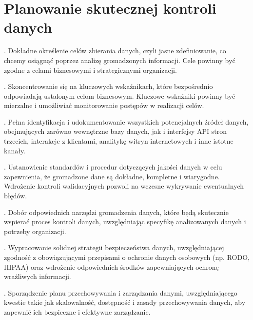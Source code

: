 \documentclass[letterpaper,10pt,polish]{sphinxmanual}
\begin{document}
\section{Planowanie skutecznej kontroli danych}
\label{\detokenize{Sprawozdanie_bazy_p1/main:planowanie-skutecznej-kontroli-danych}}
. 
Dokładne określenie celów zbierania danych, czyli jasne zdefiniowanie, co chcemy osiągnąć poprzez analizę gromadzonych informacji. Cele powinny być zgodne z celami biznesowymi i strategicznymi organizacji.

. 
Skoncentrowanie się na kluczowych wskaźnikach, które bezpośrednio odpowiadają ustalonym celom biznesowym. Kluczowe wskaźniki powinny być mierzalne i umożliwiać monitorowanie postępów w realizacji celów.

. 
Pełna identyfikacja i udokumentowanie wszystkich potencjalnych źródeł danych, obejmujących zarówno wewnętrzne bazy danych, jak i interfejsy API stron trzecich, interakcje z klientami, analitykę witryn internetowych i inne istotne kanały.

. 
Ustanowienie standardów i procedur dotyczących jakości danych w celu zapewnienia, że gromadzone dane są dokładne, kompletne i wiarygodne. Wdrożenie kontroli walidacyjnych pozwoli na wczesne wykrywanie ewentualnych błędów.

. 
Dobór odpowiednich narzędzi gromadzenia danych, które będą skutecznie wspierać proces kontroli danych, uwzględniając specyfikę analizowanych danych i potrzeby organizacji.

. 
Wypracowanie solidnej strategii bezpieczeństwa danych, uwzględniającej zgodność z obowiązującymi przepisami o ochronie danych osobowych (np. RODO, HIPAA) oraz wdrożenie odpowiednich środków zapewniających ochronę wrażliwych informacji.

. 
Sporządzenie planu przechowywania i zarządzania danymi, uwzględniającego kwestie takie jak skalowalność, dostępność i zasady przechowywania danych, aby zapewnić ich bezpieczne i efektywne zarządzanie.
\end{document}
